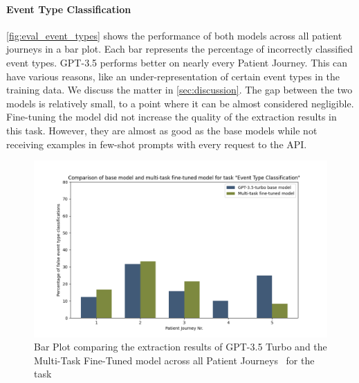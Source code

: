 \paragraph{Event Type Classification} \autoref{fig:eval_event_types} shows the performance of both models across all patient journeys in a bar plot. Each bar represents the percentage of incorrectly classified event types. GPT-3.5 performs better on nearly every Patient Journey. This can have various reasons, like an under-representation of certain event types in the training data. We discuss the matter in \autoref{sec:discussion}. The gap between the two models is relatively small, to a point where it can be almost considered negligible. Fine-tuning the model did not increase the quality of the extraction results in this task. However, they are almost as good as the base models while not receiving examples in few-shot prompts with every request to the API. 
\begin{figure}[h]
    \centering
    \captionsetup{belowskip=0pt,aboveskip=0pt}
    \includegraphics[width=\textwidth]{bachelor_thesis/images/event_types_all.png}
    \caption{Bar Plot comparing the extraction results of GPT-3.5 Turbo and the Multi-Task Fine-Tuned model across all Patient Journeys~ for the task }
    \label{fig:eval_event_types}
\end{figure}


